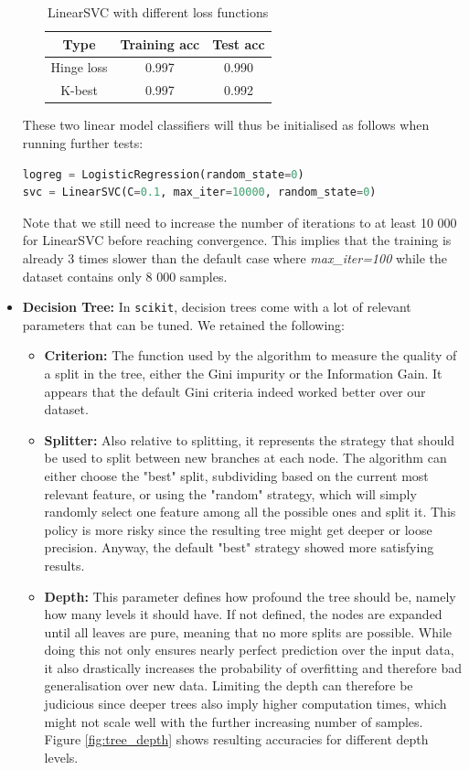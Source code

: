 \begin{itemize}
\begin{itemize}
    \begin{table}[h]
        \centering
         \begin{tabular}{|c|c|c|}
         \hline
         Type & Training acc & Test acc \\
         \hline\hline
         Hinge loss & 0.997  & 0.990\\
         \hline
         K-best & 0.997 & 0.992\\ 
         \hline
        \end{tabular}
        \caption{LinearSVC with different loss functions}
        \label{Tab:linearsvc_loss}
        \end{table}
    \end{itemize}
    These two linear model classifiers will thus be initialised as follows when running further tests:
\begin{lstlisting}[language=python]
logreg = LogisticRegression(random_state=0)
svc = LinearSVC(C=0.1, max_iter=10000, random_state=0)
\end{lstlisting}
    Note that we still need to increase the number of iterations to at least 10 000 for LinearSVC before reaching convergence. This implies that the training is already 3 times slower than the default case where \textit{max\_iter=100} while the dataset contains only 8 000 samples.
    \item \textbf{Decision Tree:} In \texttt{scikit}, decision trees come with a lot of relevant parameters that can be tuned. We retained the following:
    \begin{itemize}
        \item \textbf{Criterion:} The function used by the algorithm to measure the quality of a split in the tree, either the Gini impurity or the Information Gain. It appears that the default Gini criteria indeed worked better over our dataset.
        \item \textbf{Splitter:} Also relative to splitting, it represents the strategy that should be used to split between new branches at each node. The algorithm can either choose the "best" split, subdividing based on the current most relevant feature, or using the "random" strategy, which will simply randomly select one feature among all the possible ones and split it. This policy is more risky since the resulting tree might get deeper or loose precision. Anyway, the default "best" strategy showed more satisfying results.
        \item \textbf{Depth:} This parameter defines how profound the tree should be, namely how many levels it should have. If not defined, the nodes are expanded until all leaves are pure, meaning that no more splits are possible. While doing this not only ensures nearly perfect prediction over the input data, it also drastically increases the probability of overfitting and therefore bad generalisation over new data. Limiting the depth can therefore be judicious since deeper trees also imply higher computation times, which might not scale well with the further increasing number of samples. Figure \ref{fig:tree_depth} shows resulting accuracies for different depth levels.

\end{itemize}
\end{itemize}
